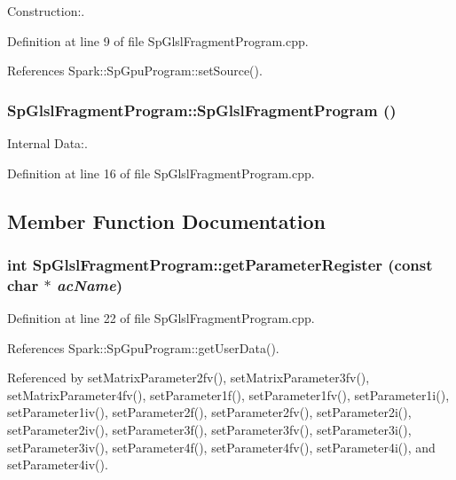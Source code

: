 Construction:. 

Definition at line 9 of file Sp\-Glsl\-Fragment\-Program.cpp.

References Spark::Sp\-Gpu\-Program::set\-Source().
\subsubsection{\setlength{\rightskip}{0pt plus 5cm}Sp\-Glsl\-Fragment\-Program::Sp\-Glsl\-Fragment\-Program ()\hspace{0.3cm}{\tt  [protected]}}\label{classSpark_1_1SpGlslFragmentProgram_b0}


Internal Data:. 

Definition at line 16 of file Sp\-Glsl\-Fragment\-Program.cpp.

\subsection{Member Function Documentation}
\subsubsection{\setlength{\rightskip}{0pt plus 5cm}int Sp\-Glsl\-Fragment\-Program::get\-Parameter\-Register (const char $\ast$ {\em ac\-Name})\hspace{0.3cm}{\tt  [protected]}}\label{classSpark_1_1SpGlslFragmentProgram_b1}


Definition at line 22 of file Sp\-Glsl\-Fragment\-Program.cpp.

References Spark::Sp\-Gpu\-Program::get\-User\-Data().

Referenced by set\-Matrix\-Parameter2fv(), set\-Matrix\-Parameter3fv(), set\-Matrix\-Parameter4fv(), set\-Parameter1f(), set\-Parameter1fv(), set\-Parameter1i(), set\-Parameter1iv(), set\-Parameter2f(), set\-Parameter2fv(), set\-Parameter2i(), set\-Parameter2iv(), set\-Parameter3f(), set\-Parameter3fv(), set\-Parameter3i(), set\-Parameter3iv(), set\-Parameter4f(), set\-Parameter4fv(), set\-Parameter4i(), and set\-Parameter4iv().
